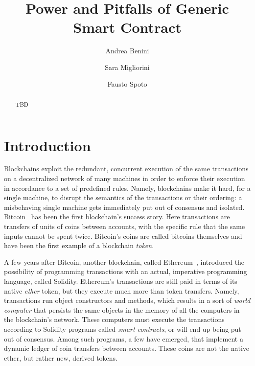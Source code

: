 \documentclass{llncs}
\begin{document}
\title{Power and Pitfalls of Generic Smart Contract}
\author{Andrea Benini \and Sara Migliorini \and Fausto Spoto}

\maketitle

\begin{abstract}
  TBD
\end{abstract}

\section{Introduction}\label{sec:introduction}

Blockchains exploit the redundant, concurrent execution of the same
transactions on a decentralized network of many machines
in order to enforce their execution in accordance to
a set of predefined rules. Namely, blockchains make it hard, for a single machine,
to disrupt the semantics of the transactions or their ordering: a misbehaving single machine
gets immediately put out of consensus and isolated. Bitcoin~\cite{Nakamoto08,book-mastering-bitcoin}
has been the first blockchain's success story. Here
transactions are transfers of units of coins between accounts, with the specific rule that
the same inputs cannot be spent twice. Bitcoin's coins are called bitcoins
themselves and have been the first example of a blockchain \emph{token}.

A few years after Bitcoin, another blockchain, called
Ethereum~\cite{Buterin13,AntonopoulosW18}, introduced the possibility of programming
transactions with an actual, imperative programming language, called Solidity.
Ethereum's transactions are still paid in terms of its native \emph{ether} token,
but they execute much more than token transfers. Namely,
transactions run object constructors and methods, which results in a sort
of \emph{world computer} that persists the same objects in the memory of all the
computers in the blockchain's network. These computers must execute
the transactions according to Solidity programs called
\emph{smart contracts}, or will end up being put out of consensus. Among such programs,
a few have emerged, that implement a dynamic ledger of coin transfers between accounts. These
coins are not the native ether, but rather new, derived tokens.
\end{document}
